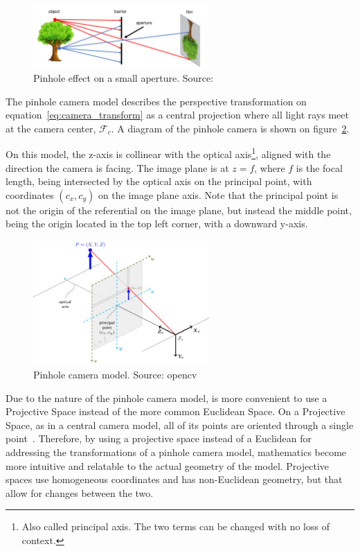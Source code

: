 \begin{figure}[H]
	\centering
	\includegraphics[width=0.6\textwidth]{img/camera/pnhole_effect.png}
	\caption{Pinhole effect on a small aperture. Source:~\cite{camera_models}}
	\label{fig:pinhole_effect}
\end{figure}

The pinhole camera model describes the perspective transformation on equation~\ref{eq:camera_transform} as a central projection where all light rays meet at the camera center, $\mathcal{F}_c$. A diagram of the pinhole camera is shown on figure~\ref{fig:pinhole_camera_model}. 

On this model, the z-axis is collinear with the optical axis\footnote{Also called principal axis. The two terms can be changed with no loss of context.}, aligned with the direction the camera is facing. The image plane is at $z = f$, where $f$ is the focal length, being intersected by the optical axis on the principal point, with coordinates $(c_x, c_y)$ on the image plane axis. Note that the principal point is not the origin of the referential on the image plane, but instead the middle point, being the origin located in the top left corner, with a downward y-axis.

\begin{figure}[H]
	\centering
	\includegraphics[width=0.6\textwidth]{img/camera/pinhole_camera_model.png}
	\caption{Pinhole camera model. Source: \acl{opencv}\cite{opencv_doc}}
	\label{fig:pinhole_camera_model}
\end{figure}

Due to the nature of the pinhole camera model, is more convenient to use a Projective Space instead of the more common Euclidean Space\cite{mvg_book, camera_models, Sturm2010}. On a Projective Space, as in a central camera model, all of its points are oriented through a single point~\cite{mvg_book}. Therefore, by using a projective space instead of a Euclidean for addressing the transformations of a pinhole camera model, mathematics become more intuitive and relatable to the actual geometry of the model. Projective spaces use homogeneous coordinates and has non-Euclidean geometry, but that allow for changes between the two\cite{mvg_book, camera_models}.

